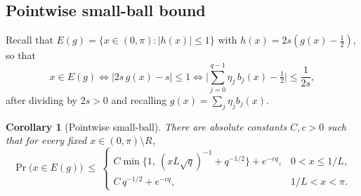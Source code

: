 \documentclass[11pt,reqno]{amsart}
\theoremstyle{plain}
\newtheorem{corollary}{Corollary}
\theoremstyle{definition}
\theoremstyle{remark}
\begin{document}
\subsection{Pointwise small-ball bound}

Recall that $E(g)=\{x\in(0,\pi):|h(x)|\le1\}$ with $h(x)=2s(g(x)-\tfrac12)$, so that
\[
x\in E(g)\iff |2s\,g(x)-s|\le 1\iff \Big|\sum_{j=0}^{q-1}\eta_j\,b_j(x)-\tfrac1{2}\Big|\le\frac{1}{2s},
\]
after dividing by $2s>0$ and recalling $g(x)=\sum_j\eta_j b_j(x)$.

\begin{corollary}[Pointwise small-ball]\label{cor:smallball}
There are absolute constants $C,c>0$ such that for every fixed $x\in(0,\pi)\setminus R$,
\[
\Pr\big(x\in E(g)\big)\ \le\
\begin{cases}
C\min\Big\{1,\ (xL\sqrt q)^{-1}+q^{-1/2}\Big\}+e^{-cq}, & 0<x\le 1/L,\\[2mm]
C\,q^{-1/2}+e^{-cq}, & 1/L<x<\pi.
\end{cases}
\]
\end{corollary}
\end{document}
